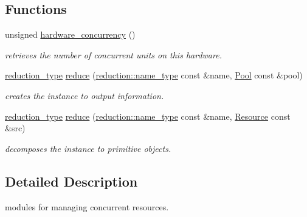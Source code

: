 \subsection*{Functions}
\begin{DoxyCompactItemize}
\item 
\hypertarget{namespacehryky_1_1thread_aecfbde694375a1c24e081c7c785e52a1}{unsigned \hyperlink{namespacehryky_1_1thread_aecfbde694375a1c24e081c7c785e52a1}{hardware\-\_\-concurrency} ()}\label{namespacehryky_1_1thread_aecfbde694375a1c24e081c7c785e52a1}

\begin{DoxyCompactList}\small\item\em retrieves the number of concurrent units on this hardware. \end{DoxyCompactList}\item 
\hyperlink{namespacehryky_a343a9a4c36a586be5c2693156200eadc}{reduction\-\_\-type} \hyperlink{namespacehryky_1_1thread_aed5a09e1236726d3b2a02cff74f53524}{reduce} (\hyperlink{namespacehryky_1_1reduction_ac686c30a4c8d196bbd0f05629a6b921f}{reduction\-::name\-\_\-type} const \&name, \hyperlink{classhryky_1_1thread_1_1_pool}{Pool} const \&pool)
\begin{DoxyCompactList}\small\item\em creates the instance to output information. \end{DoxyCompactList}\item 
\hypertarget{namespacehryky_1_1thread_acab41b0d005fb67fb4867c5ce8782202}{\hyperlink{namespacehryky_a343a9a4c36a586be5c2693156200eadc}{reduction\-\_\-type} \hyperlink{namespacehryky_1_1thread_acab41b0d005fb67fb4867c5ce8782202}{reduce} (\hyperlink{namespacehryky_1_1reduction_ac686c30a4c8d196bbd0f05629a6b921f}{reduction\-::name\-\_\-type} const \&name, \hyperlink{classhryky_1_1thread_1_1_resource}{Resource} const \&src)}\label{namespacehryky_1_1thread_acab41b0d005fb67fb4867c5ce8782202}

\begin{DoxyCompactList}\small\item\em decomposes the instance to primitive objects. \end{DoxyCompactList}\end{DoxyCompactItemize}


\subsection{Detailed Description}
modules for managing concurrent resources. 

